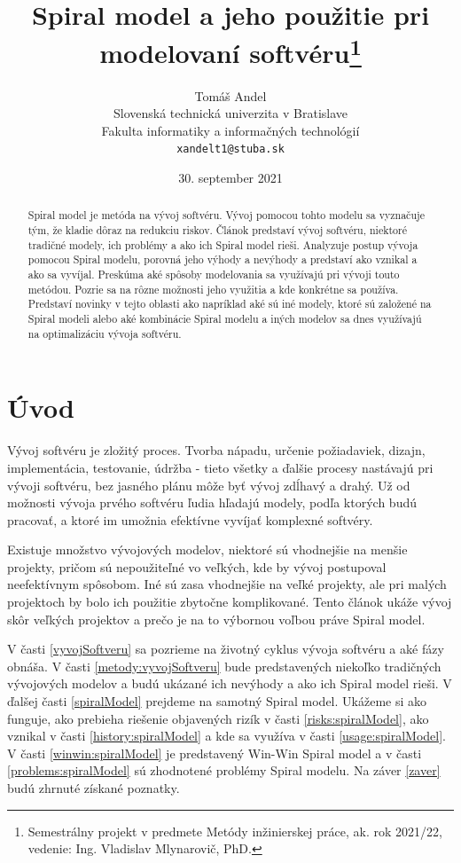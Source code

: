 \documentclass[10pt,twoside,slovak,a4paper]{article}
\title{Spiral model a jeho použitie pri modelovaní softvéru\thanks{Semestrálny projekt v predmete Metódy inžinierskej práce, ak. rok 2021/22, vedenie: Ing. Vladislav Mlynarovič, PhD.}}
\author{Tomáš Andel\\[2pt]
	{\small Slovenská technická univerzita v Bratislave}\\
	{\small Fakulta informatiky a informačných technológií}\\
	{\small \texttt{xandelt1@stuba.sk}}
	}
\date{\small 30. september 2021}
\begin{document}
\maketitle

\begin{abstract}
Spiral model je metóda na vývoj softvéru. Vývoj pomocou tohto modelu sa vyznačuje tým, že kladie dôraz na redukciu riskov. Článok predstaví vývoj softvéru, niektoré tradičné modely, ich problémy a ako ich Spiral model rieši. Analyzuje postup vývoja pomocou Spiral modelu, porovná jeho výhody a nevýhody a predstaví ako vznikal a ako sa vyvíjal. Preskúma aké spôsoby modelovania sa využívajú pri vývoji touto metódou. Pozrie sa na rôzne možnosti jeho využitia a kde konkrétne sa používa. Predstaví novinky v tejto oblasti ako napríklad aké sú iné modely, ktoré sú založené na Spiral modeli alebo aké kombinácie Spiral modelu a iných modelov sa dnes využívajú na optimalizáciu vývoja softvéru.
\end{abstract}

\section{Úvod}

Vývoj softvéru je zložitý proces. Tvorba nápadu, určenie požiadaviek, dizajn, implementácia, testovanie, údržba - tieto všetky a ďalšie procesy nastávajú pri vývoji softvéru, bez jasného plánu môže byť vývoj zdĺhavý a drahý. Už od možnosti vývoja prvého softvéru ľudia hľadajú modely, podľa ktorých budú pracovať, a ktoré im umožnia efektívne vyvíjať komplexné softvéry.

Existuje množstvo vývojových modelov, niektoré sú vhodnejšie na menšie projekty, pričom sú nepoužiteľné vo veľkých, kde by vývoj postupoval neefektívnym spôsobom. Iné sú zasa vhodnejšie na veľké projekty, ale pri malých projektoch by bolo ich použitie zbytočne komplikované. Tento článok ukáže vývoj skôr veľkých projektov a prečo je na to výbornou voľbou práve Spiral model.

V časti \ref{vyvojSoftveru} sa pozrieme na životný cyklus vývoja softvéru a aké fázy obnáša. V časti \ref{metody:vyvojSoftveru} bude predstavených niekoľko tradičných vývojových modelov a budú ukázané ich nevýhody a ako ich Spiral model rieši. V ďalšej časti \ref{spiralModel} prejdeme na samotný Spiral model. Ukážeme si ako funguje, ako prebieha riešenie objavených rizík v časti \ref{risks:spiralModel}, ako vznikal v časti \ref{history:spiralModel} a kde sa využíva v časti \ref{usage:spiralModel}. V časti \ref{winwin:spiralModel} je predstavený Win-Win Spiral model a v časti \ref{problems:spiralModel} sú zhodnotené problémy Spiral modelu. Na záver \ref{zaver} budú zhrnuté získané poznatky.
\end{document}
